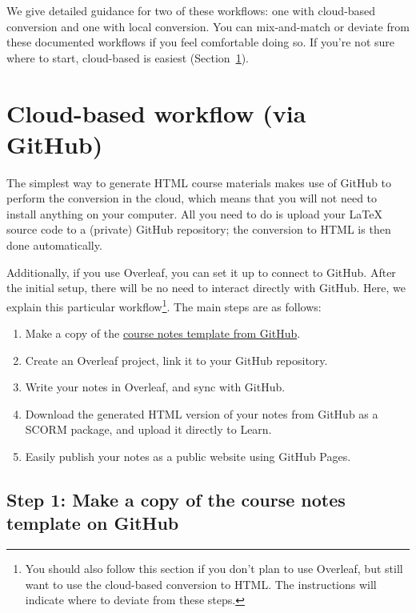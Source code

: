 We give detailed guidance for two of these workflows: one with cloud-based conversion and one with local conversion. You can mix-and-match or deviate from these documented workflows if you feel comfortable doing so. If you're not sure where to start, cloud-based is easiest (Section~\ref{sec:github}).


\section{Cloud-based workflow (via GitHub)}
\label{sec:github}

The simplest way to generate HTML course materials makes use of GitHub to perform the conversion in the cloud, which means that you will not need to install anything on your computer. All you need to do is upload your \LaTeX{} source code to a (private) GitHub repository; the conversion to HTML is then done automatically.

Additionally, if you use Overleaf, you can set it up to connect to GitHub. After the initial setup, there will be no need to interact directly with GitHub. Here, we explain this particular workflow\footnote{You should also follow this section if you don't plan to use Overleaf, but still want to use the cloud-based conversion to HTML. The instructions will indicate where to deviate from these steps.}. The main steps are as follows:

\begin{enumerate}[align=left]
    \item[Step 1:] Make a copy of the \href{https://github.com/UoE-School-of-Mathematics/Workflow-Template-Blank}{course notes template from GitHub}.
    \item[Step 2:] Create an Overleaf project, link it to your GitHub repository.
    \item[Step 3:] Write your notes in Overleaf, and sync with GitHub.
    \item[Step 4:] Download the generated HTML version of your notes from GitHub as a SCORM package, and upload it directly to Learn.
    \item[Step 5 (optional):] Easily publish your notes as a public website using GitHub Pages.
\end{enumerate}


\subsection{Step 1: Make a copy of the course notes template on GitHub}
\label{ssec:github}

